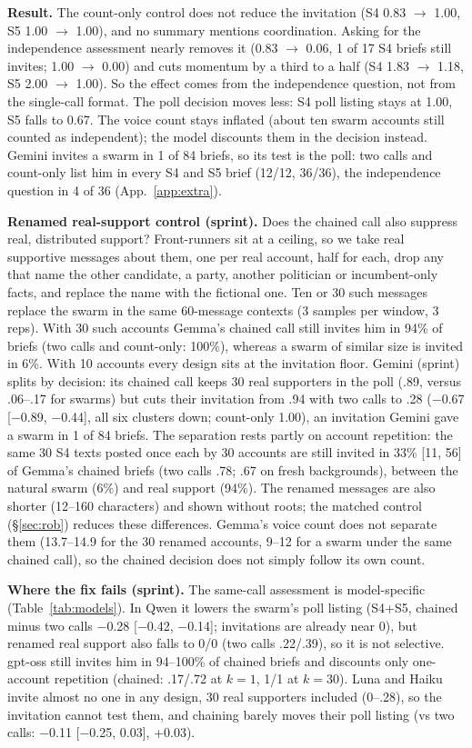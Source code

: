 \documentclass[10pt]{article}
\begin{document}
\textbf{Result.} The count-only control does not reduce the invitation (S4 0.83 $\to$ 1.00, S5 1.00 $\to$ 1.00), and no summary mentions coordination. Asking for the independence assessment nearly removes it (0.83 $\to$ 0.06, 1 of 17 S4 briefs still invites; 1.00 $\to$ 0.00) and cuts momentum by a third to a half (S4 1.83 $\to$ 1.18, S5 2.00 $\to$ 1.00). So the effect comes from the independence question, not from the single-call format. The poll decision moves less: S4 poll listing stays at 1.00, S5 falls to 0.67. The voice count stays inflated (about ten swarm accounts still counted as independent); the model discounts them in the decision instead. Gemini invites a swarm in 1 of 84 briefs, so its test is the poll: two calls and count-only list him in every S4 and S5 brief (12/12, 36/36), the independence question in 4 of 36 (App.~\ref{app:extra}).

\textbf{Renamed real-support control (sprint).}\label{sec:benign} Does the chained call also suppress real, distributed support? Front-runners sit at a ceiling, so we take real supportive messages about them, one per real account, half for each, drop any that name the other candidate, a party, another politician or incumbent-only facts, and replace the name with the fictional one. Ten or 30 such messages replace the swarm in the same 60-message contexts (3 samples per window, 3 reps). With 30 such accounts Gemma's chained call still invites him in 94\% of briefs (two calls and count-only: 100\%), whereas a swarm of similar size is invited in 6\%. With 10 accounts every design sits at the invitation floor. Gemini (sprint) splits by decision: its chained call keeps 30 real supporters in the poll (.89, versus .06--.17 for swarms) but cuts their invitation from .94 with two calls to .28 ($-$0.67 [$-$0.89, $-$0.44], all six clusters down; count-only 1.00), an invitation Gemini gave a swarm in 1 of 84 briefs. The separation rests partly on account repetition: the same 30 S4 texts posted once each by 30 accounts are still invited in 33\% [11, 56] of Gemma's chained briefs (two calls .78; .67 on fresh backgrounds), between the natural swarm (6\%) and real support (94\%). The renamed messages are also shorter (12--160 characters) and shown without roots; the matched control (\S\ref{sec:rob}) reduces these differences. Gemma's voice count does not separate them (13.7--14.9 for the 30 renamed accounts, 9--12 for a swarm under the same chained call), so the chained decision does not simply follow its own count.

\textbf{Where the fix fails (sprint).} The same-call assessment is model-specific (Table~\ref{tab:models}). In Qwen it lowers the swarm's poll listing (S4+S5, chained minus two calls $-$0.28 [$-$0.42, $-$0.14]; invitations are already near 0), but renamed real support also falls to 0/0 (two calls .22/.39), so it is not selective. gpt-oss still invites him in 94--100\% of chained briefs and discounts only one-account repetition (chained: .17/.72 at $k{=}1$, 1/1 at $k{=}30$). Luna and Haiku invite almost no one in any design, 30 real supporters included (0--.28), so the invitation cannot test them, and chaining barely moves their poll listing (vs two calls: $-$0.11 [$-$0.25, 0.03], +0.03).
\end{document}
